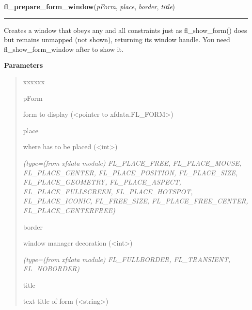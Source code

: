 \hspace{.8\funcindent}\begin{boxedminipage}{\funcwidth}

    \raggedright \textbf{fl\_prepare\_form\_window}(\textit{pForm}, \textit{place}, \textit{border}, \textit{title})

    \vspace{-1.5ex}

    \rule{\textwidth}{0.5\fboxrule}
\setlength{\parskip}{2ex}
    Creates a window that obeys any and all constraints just as 
    fl\_show\_form() does but remains unmapped (not shown), returning its 
    window handle. You need fl\_show\_form\_window after to show it.

\setlength{\parskip}{1ex}
      \textbf{Parameters}
      \vspace{-1ex}

      \begin{quote}
        \begin{Ventry}{xxxxxx}

          \item[pForm]

          form to display ({\textless}pointer to 
          xfdata.FL\_FORM{\textgreater})

          \item[place]

          where has to be placed ({\textless}int{\textgreater})

            {\it (type=(from xfdata module) FL\_PLACE\_FREE, FL\_PLACE\_MOUSE, FL\_PLACE\_CENTER, 
FL\_PLACE\_POSITION, FL\_PLACE\_SIZE, FL\_PLACE\_GEOMETRY, 
FL\_PLACE\_ASPECT, FL\_PLACE\_FULLSCREEN, FL\_PLACE\_HOTSPOT, 
FL\_PLACE\_ICONIC, FL\_FREE\_SIZE, FL\_PLACE\_FREE\_CENTER, 
FL\_PLACE\_CENTERFREE)}

          \item[border]

          window manager decoration ({\textless}int{\textgreater})

            {\it (type=(from xfdata module) FL\_FULLBORDER, FL\_TRANSIENT, FL\_NOBORDER)}

          \item[title]

          text title of form ({\textless}string{\textgreater})

        \end{Ventry}

      \end{quote}


\end{boxedminipage}
